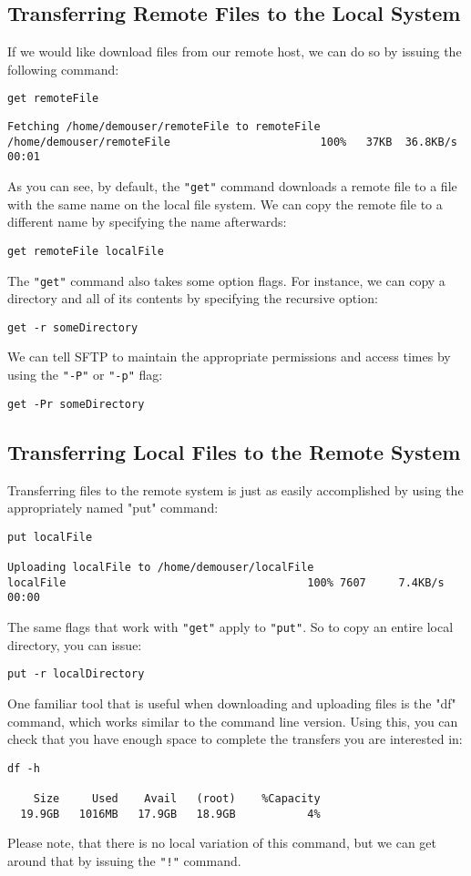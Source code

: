 \documentclass{article}
\begin{document}
\subsection{Transferring Remote Files to the Local System}
If we would like download files from our remote host, we can do so by issuing the following command:
\begin{verbatim}
get remoteFile 
\end{verbatim}
\begin{verbatim}
Fetching /home/demouser/remoteFile to remoteFile
/home/demouser/remoteFile                       100%   37KB  36.8KB/s   00:01
\end{verbatim}
As you can see, by default, the \verb+"get"+ command downloads a remote file to a file with the same name on the local file system.
We can copy the remote file to a different name by specifying the name afterwards:
\begin{verbatim}
get remoteFile localFile 
\end{verbatim}
The \verb+"get"+ command also takes some option flags. For instance, we can copy a directory and all of its contents by specifying the recursive option:
\begin{verbatim}
get -r someDirectory 
\end{verbatim}
We can tell SFTP to maintain the appropriate permissions and access times by using the \verb+"-P"+ or \verb+"-p"+ flag:
\begin{verbatim}
get -Pr someDirectory 
\end{verbatim}
\subsection{Transferring Local Files to the Remote System}
Transferring files to the remote system is just as easily accomplished by using the appropriately named "put" command:
\begin{verbatim}
put localFile

Uploading localFile to /home/demouser/localFile
localFile                                     100% 7607     7.4KB/s   00:00 
\end{verbatim}
The same flags that work with \verb+"get"+ apply to \verb+"put"+. So to copy an entire local directory, you can issue:
\begin{verbatim}
put -r localDirectory
\end{verbatim}
One familiar tool that is useful when downloading and uploading files is the "df" command, which works similar to the command line version. Using this, you can check that you have enough space to complete the transfers you are interested in:
\begin{verbatim}
df -h

    Size     Used    Avail   (root)    %Capacity
  19.9GB   1016MB   17.9GB   18.9GB           4%
\end{verbatim}
Please note, that there is no local variation of this command, but we can get around that by issuing the \verb+"!"+ command.
\end{document}
